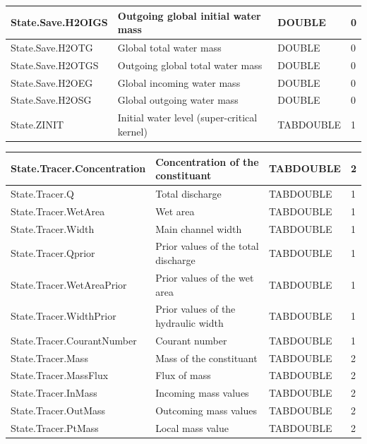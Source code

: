 \documentclass[a4paper,11pt]{article}
\begin{document}
\begin{landscape}
\begin{table}[ht]
\begin{center}
\begin{tabular}{|l|l|l|l|}
\hline  State.Save.H2OIGS & Outgoing global initial water mass & DOUBLE & 0 \\
\hline  State.Save.H2OTG & Global total water mass & DOUBLE & 0 \\
\hline  State.Save.H2OTGS & Outgoing global total water mass & DOUBLE & 0 \\
\hline  State.Save.H2OEG & Global incoming water mass & DOUBLE & 0 \\
\hline  State.Save.H2OSG & Global outgoing water mass & DOUBLE & 0 \\
\hline  State.ZINIT & Initial water level (super-critical kernel) & TABDOUBLE & 1 \\

\hline 
\end{tabular} 
\end{center}
\end{table}
\begin{table}[ht]
\begin{center}
\begin{tabular}{|l|l|l|l|}

\hline  State.Tracer.Concentration & Concentration of the constituant & TABDOUBLE & 2 \\
\hline  State.Tracer.Q & Total discharge & TABDOUBLE & 1 \\
\hline  State.Tracer.WetArea & Wet area & TABDOUBLE & 1 \\
\hline  State.Tracer.Width & Main channel width & TABDOUBLE & 1 \\
\hline  State.Tracer.Qprior & Prior values of the total discharge & TABDOUBLE & 1 \\
\hline  State.Tracer.WetAreaPrior & Prior values of the wet area & TABDOUBLE & 1 \\
\hline  State.Tracer.WidthPrior & Prior values of the hydraulic width & TABDOUBLE & 1 \\
\hline  State.Tracer.CourantNumber & Courant number & TABDOUBLE & 1 \\
\hline  State.Tracer.Mass & Mass of the constituant & TABDOUBLE & 2 \\
\hline  State.Tracer.MassFlux & Flux of mass & TABDOUBLE & 2 \\
\hline  State.Tracer.InMass & Incoming mass values & TABDOUBLE & 2 \\
\hline  State.Tracer.OutMass & Outcoming mass values & TABDOUBLE & 2 \\
\hline  State.Tracer.PtMass & Local mass value & TABDOUBLE & 2 \\

\hline 
\end{tabular} 
\end{center}
\end{table}
\end{landscape}
\end{document}
